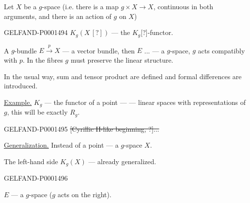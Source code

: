 Let $X$ be a $g$-space
(i.e. there is a map $g\times X\longrightarrow X$,
continuous in both arguments, and there is
an action of $g$ on $X$)

\begin{GelfandAdjacentEvidence}{GELFAND-P000149}{4}
$K_g (X\, [?])$ — the $K_g$[?]-functor.
\end{GelfandAdjacentEvidence}

A $g$-bundle $E\overset p\longrightarrow X$ — a vector bundle, then $E$ ...
— a $g$-space, $g$ acts compatibly with $p$.
In the fibres $g$ must preserve the linear structure.

In the usual way, sum and tensor product are defined and
formal differences are introduced.

\underline{Example.} $K_g$ — the functor of a point —
— linear spaces with representations of $g$,
this will be exactly $R_g$.

\begin{GelfandAdjacentEvidence}{GELFAND-P000149}{5}
\sout{[Cyrillic Н-like beginning, ?]...}
\end{GelfandAdjacentEvidence}

\underline{Generalization.} Instead of a point — a $g$-space $X$.

The left-hand side $K_g (X)$ — already generalized.

\begin{GelfandAdjacentEvidence}{GELFAND-P000149}{6}
\begin{center}
\end{center}
$E$ — a $g$-space ($g$ acts on the right).
\end{GelfandAdjacentEvidence}



